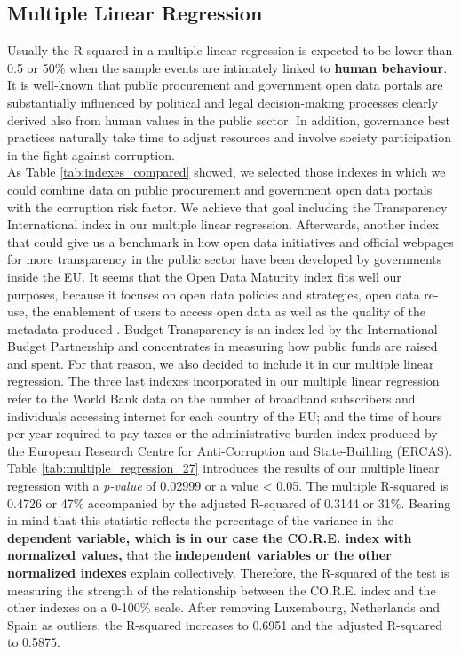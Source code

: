 \documentclass[a4paper, twoside]{report}
\begin{document}
\subsection{Multiple Linear Regression}
\label{multi_regression}

Usually the R-squared in a multiple linear regression is expected to be lower than 0.5 or 50\% when the sample events are intimately linked to \textbf{human behaviour}. It is well-known that public procurement and government open data portals are substantially influenced by political and legal decision-making processes clearly derived also from human values in the public sector. In addition, governance best practices naturally take time to adjust resources and involve society participation in the fight against corruption.\\ 

As Table \ref{tab:indexes_compared} showed, we selected those indexes in which we could combine data on public procurement and government open data portals with the corruption risk factor. We achieve that goal including the Transparency International index in our multiple linear regression. Afterwards, another index that could give us a benchmark in how open data initiatives and official webpages for more transparency in the public sector have been developed by governments inside the EU. It seems that the Open Data Maturity index fits well our purposes, because it focuses on open data policies and strategies, open data re-use, the enablement of users to access open data as well as the quality of the metadata produced \citep{open_data_maturity}. Budget Transparency is an index led by the International Budget Partnership and concentrates in measuring how public funds are raised and spent. For that reason, we also decided to include it in our multiple linear regression. The three last indexes incorporated in our multiple linear regression refer to the World Bank data on the number of broadband subscribers and individuals accessing internet for each country of the EU; and the time of hours per year required to pay taxes or the administrative burden index produced by the European Research Centre for Anti-Corruption and State-Building (ERCAS).\\

Table \ref{tab:multiple_regression_27} introduces the results of our multiple linear regression with a \textit{p-value} of 0.02999 or a value < 0.05. The multiple R-squared is 0.4726 or 47\% accompanied by the adjusted R-squared of 0.3144 or 31\%. Bearing in mind that this statistic reflects the percentage of the variance in the \textbf{dependent variable, which is in our case the CO.R.E. index with normalized values,} that the \textbf{independent variables or the other normalized indexes} explain collectively. Therefore, the R-squared of the test is measuring the strength of the relationship between the CO.R.E. index and the other indexes on a 0-100\% scale. After removing Luxembourg, Netherlands and Spain as outliers, the R-squared increases to 0.6951 and the adjusted R-squared to 0.5875.
\end{document}
